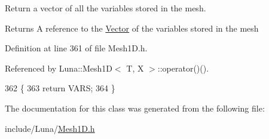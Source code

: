 Return a vector of all the variables stored in the mesh. 

\begin{DoxyReturn}{Returns}
A reference to the \hyperlink{classLuna_1_1Vector}{Vector} of the variables stored in the mesh 
\end{DoxyReturn}


Definition at line 361 of file Mesh1\+D.\+h.



Referenced by Luna\+::\+Mesh1\+D$<$ T, X $>$\+::operator()().


\begin{DoxyCode}
362   \{
363     \textcolor{keywordflow}{return} VARS;
364   \}
\end{DoxyCode}


The documentation for this class was generated from the following file\+:\begin{DoxyCompactItemize}
\item 
include/\+Luna/\hyperlink{Mesh1D_8h}{Mesh1\+D.\+h}\end{DoxyCompactItemize}
